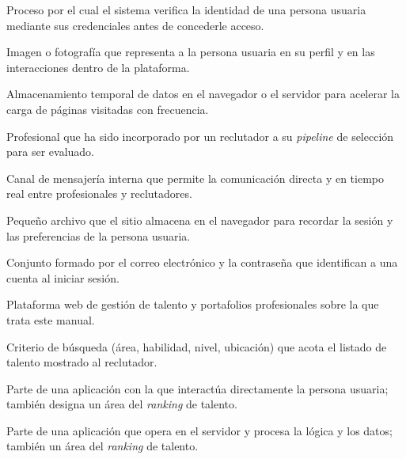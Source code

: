 \begin{description}[style=unboxed,leftmargin=0pt,itemsep=4pt]
    \item[\textcolor{colorPrimario}{\textbf{Autenticación}}] Proceso por el cual el
    sistema verifica la identidad de una persona usuaria mediante sus credenciales antes
    de concederle acceso.

    \item[\textcolor{colorPrimario}{\textbf{Avatar}}] Imagen o fotografía que representa
    a la persona usuaria en su perfil y en las interacciones dentro de la plataforma.

    \item[\textcolor{colorPrimario}{\textbf{Caché}}] Almacenamiento temporal de datos en
    el navegador o el servidor para acelerar la carga de páginas visitadas con
    frecuencia.

    \item[\textcolor{colorPrimario}{\textbf{Candidato}}] Profesional que ha sido
    incorporado por un reclutador a su \textit{pipeline} de selección para ser evaluado.

    \item[\textcolor{colorPrimario}{\textbf{Chat}}] Canal de mensajería interna que
    permite la comunicación directa y en tiempo real entre profesionales y reclutadores.

    \item[\textcolor{colorPrimario}{\textbf{Cookie}}] Pequeño archivo que el sitio
    almacena en el navegador para recordar la sesión y las preferencias de la persona
    usuaria.

    \item[\textcolor{colorPrimario}{\textbf{Credenciales}}] Conjunto formado por el
    correo electrónico y la contraseña que identifican a una cuenta al iniciar sesión.

    \item[\textcolor{colorPrimario}{\textbf{EthosHub}}] Plataforma web de gestión de
    talento y portafolios profesionales sobre la que trata este manual.

    \item[\textcolor{colorPrimario}{\textbf{Filtro}}] Criterio de búsqueda (área,
    habilidad, nivel, ubicación) que acota el listado de talento mostrado al reclutador.

    \item[\textcolor{colorPrimario}{\textbf{Frontend}}] Parte de una aplicación con la
    que interactúa directamente la persona usuaria; también designa un área del
    \textit{ranking} de talento.

    \item[\textcolor{colorPrimario}{\textbf{Backend}}] Parte de una aplicación que opera
    en el servidor y procesa la lógica y los datos; también un área del \textit{ranking}
    de talento.


\end{description}
